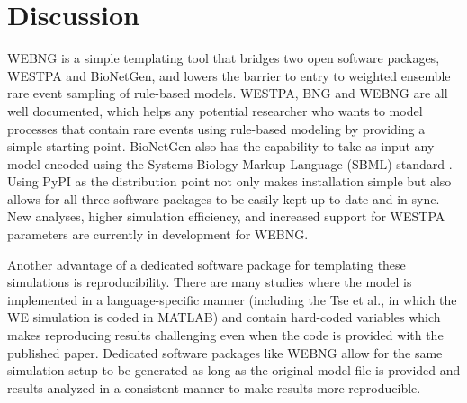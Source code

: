 \documentclass[10pt,letterpaper]{article}
\begin{document}
\begin{figure}[h!]


\label{fig3} %
\end{figure}


\section*{Discussion}
WEBNG is a simple templating tool that bridges two open software packages, WESTPA and BioNetGen, and lowers the barrier to entry to weighted ensemble rare event sampling of rule-based models. WESTPA, BNG and WEBNG are all well documented, which helps any potential researcher who wants to model processes that contain rare events using rule-based modeling by providing a simple starting point. BioNetGen also has the capability to take as input any model encoded using the Systems Biology Markup Language (SBML) standard \cite{keating2020sbml}. Using PyPI as the distribution point not only makes installation simple but also allows for all three software packages to be easily kept up-to-date and in sync. New analyses, higher simulation efficiency, and increased support for WESTPA parameters are currently in development for WEBNG.

Another advantage of a dedicated software package for templating these simulations is reproducibility. There are many studies where the model is implemented in a language-specific manner (including the Tse et al.\cite{TseRead}, in which the WE simulation is coded in MATLAB) 
and contain hard-coded variables which makes reproducing results challenging even when the code is provided with the published paper. Dedicated software packages like WEBNG allow for the same simulation setup to be generated as long as the original model file is provided and results analyzed in a consistent manner to make results more reproducible.
\end{document}
